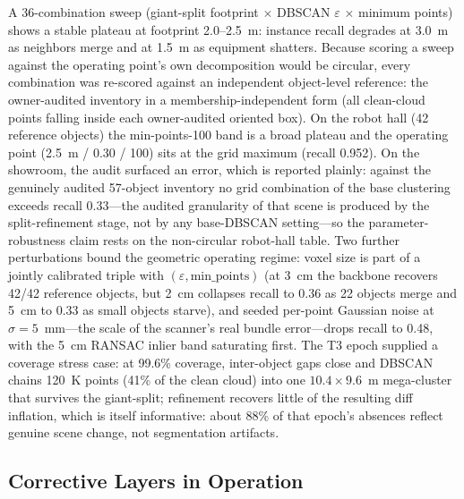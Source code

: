 A 36-combination sweep (giant-split footprint $\times$ DBSCAN $\varepsilon$
$\times$ minimum points) shows a stable plateau at footprint 2.0--2.5~m:
instance recall degrades at 3.0~m as neighbors merge and at 1.5~m as equipment
shatters. Because scoring a sweep against the operating point's own
decomposition would be circular, every combination was re-scored against an
independent object-level reference: the owner-audited inventory in a
membership-independent form (all clean-cloud points falling inside each
owner-audited oriented box). On the robot hall (42 reference objects) the
min-points-100 band is a broad plateau and the operating point (2.5~m / 0.30 /
100) sits at the grid maximum (recall 0.952). On the showroom, the audit
surfaced an error, which is reported plainly: against the genuinely audited 57-object
inventory no grid combination of the base clustering exceeds recall 0.33---the
audited granularity of that scene is produced by the split-refinement stage,
not by any base-DBSCAN setting---so the parameter-robustness claim rests on the
non-circular robot-hall table. Two further perturbations bound the geometric
operating regime: voxel size is part of a jointly calibrated triple with
$(\varepsilon,\mathrm{min\_points})$ (at 3~cm the backbone recovers 42/42
reference objects, but 2~cm collapses recall to 0.36 as 22 objects merge and
5~cm to 0.33 as small objects starve), and seeded per-point Gaussian noise at
$\sigma=5$~mm---the scale of the scanner's real bundle error---drops recall to
0.48, with the 5~cm RANSAC inlier band saturating first. The T3 epoch supplied
a coverage stress case: at 99.6\% coverage, inter-object gaps close and DBSCAN
chains 120~K points (41\% of the clean cloud) into one $10.4\times9.6$~m
mega-cluster that survives the giant-split; refinement recovers little of the
resulting diff inflation, which is itself informative: about 88\% of that
epoch's absences reflect genuine scene change, not segmentation artifacts.

\subsection{Corrective Layers in Operation}
\label{subsec:exp-corrective}

